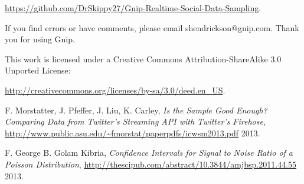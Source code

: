 \documentclass{article}
\begin{document}
\noindent \url{https://github.com/DrSkippy27/Gnip-Realtime-Social-Data-Sampling}.

If you find errors
or have comments, please email shendrickson@gnip.com. Thank you for using Gnip.

This work is licensed under a Creative Commons Attribution-ShareAlike 3.0 Unported License:

\noindent \url{http://creativecommons.org/licenses/by-sa/3.0/deed.en_US}.


\begin{thebibliography}{2013}

 F. Morstatter, J. Pfeffer, J. Liu, K. Carley, \textsl{Is the Sample Good Enough? Comparing Data from Twitter’s Streaming API with Twitter’s Firehose}, \url{http://www.public.asu.edu/~fmorstat/paperpdfs/icwsm2013.pdf} 2013.

 F. George B. Golam Kibria, \textsl{Confidence Intervals for Signal to Noise Ratio of
a Poisson Distribution}, \url{http://thescipub.com/abstract/10.3844/amjbsp.2011.44.55} 2013.

\end{thebibliography}
\end{document}
